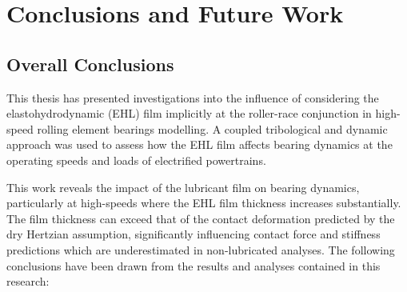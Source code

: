 \chapter{Conclusions and Future Work}
\label{Conclusions}

\section{Overall Conclusions}

This thesis has presented investigations into the influence of considering the elastohydrodynamic (EHL) film implicitly at the roller-race conjunction in high-speed rolling element bearings modelling. A coupled tribological and dynamic approach was used to assess how the EHL film affects bearing dynamics at the operating speeds and loads of electrified powertrains.

This work reveals the impact of the lubricant film on bearing dynamics, particularly at high-speeds where the EHL film thickness increases substantially. The film thickness can exceed that of the contact deformation predicted by the dry Hertzian assumption, significantly influencing contact force and stiffness predictions which are underestimated in non-lubricated analyses. The following conclusions have been drawn from the results and analyses contained in this research:

